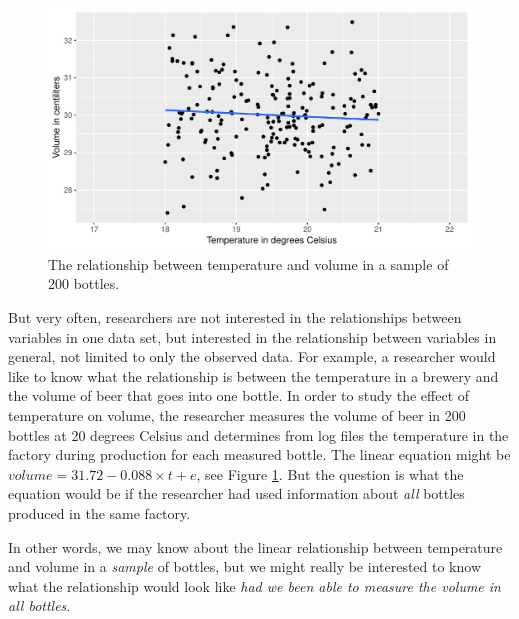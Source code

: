 \documentclass[]{report}\usepackage[]{graphicx}\usepackage[]{color}
\makeatletter
\def\maxwidth{ %
  \ifdim\Gin@nat@width>\linewidth
    \linewidth
  \else
    \Gin@nat@width
  \fi
}
\newenvironment{knitrout}{}{} %
\makeatother
\begin{document}
\begin{knitrout}
\color{fgcolor}\begin{figure}

{\centering \includegraphics[width=\maxwidth]{figure/inf_0-1} 

}

\caption[The relationship between temperature and volume in a sample of 200 bottles]{The relationship between temperature and volume in a sample of 200 bottles.}\label{fig:inf_0}
\end{figure}


\end{knitrout}


But very often, researchers are not interested in the relationships between variables in one data set, but interested in the relationship between variables in general, not limited to only the observed data. For example, a researcher would like to know what the relationship is between the temperature in a brewery and the volume of beer that goes into one bottle. In order to study the effect of temperature on volume, the researcher measures the volume of beer in 200 bottles at 20 degrees Celsius and determines from log files the temperature in the factory during production for each measured bottle. The linear equation might be $volume = 31.72 -0.088 \times t + e$, see Figure \ref{fig:inf_0}. But the question is what the equation would be if the researcher had used information about \textit{all} bottles produced in the same factory.



In other words, we may know about the linear relationship between temperature and volume in a \textit{sample} of bottles, but we might really be interested to know what the relationship would look like \textit{had we been able to measure the volume in all bottles}.
\end{document}

